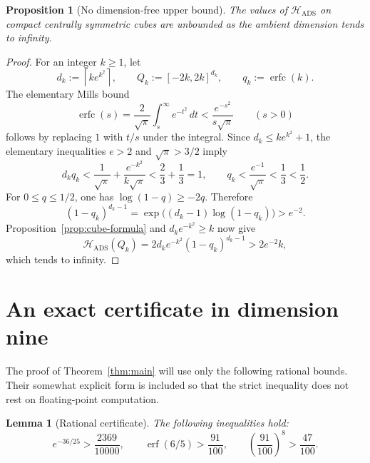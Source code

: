 \documentclass[11pt,reqno]{amsart}
\newtheorem{proposition}[theorem]{Proposition}
\newtheorem{lemma}[theorem]{Lemma}
\theoremstyle{remark}
\DeclareMathOperator{\erf}{erf}
\DeclareMathOperator{\erfc}{erfc}
\newcommand{\Hads}{\mathcal{H}_{\mathrm{ADS}}}
\begin{document}
\begin{proposition}[No dimension-free upper bound]\label{prop:unbounded}
The values of \(\Hads\) on compact centrally symmetric cubes are unbounded
as the ambient dimension tends to infinity.
\end{proposition}

\begin{proof}
For an integer \(k\ge1\), let
\[
 d_k:=\left\lceil k e^{k^2}\right\rceil,
 \qquad Q_k:=[-2k,2k]^{d_k},
 \qquad q_k:=\erfc(k).
\]
The elementary Mills bound
\begin{equation}\label{eq:mills}
 \erfc(s)
 =\frac{2}{\sqrt\pi}\int_s^\infty e^{-t^2}\,dt
 <\frac{e^{-s^2}}{s\sqrt\pi}
 \qquad(s>0)
\end{equation}
follows by replacing \(1\) with \(t/s\) under the integral.  Since
\(d_k\le k e^{k^2}+1\), the elementary inequalities \(e>2\) and
\(\sqrt\pi>3/2\) imply
\[
 d_kq_k
 <\frac1{\sqrt\pi}+\frac{e^{-k^2}}{k\sqrt\pi}
 <\frac23+\frac13=1,
 \qquad
 q_k<\frac{e^{-1}}{\sqrt\pi}<\frac13<\frac12.
\]
For \(0\le q\le1/2\), one has
\(\log(1-q)\ge-2q\).  Therefore
\[
 (1-q_k)^{d_k-1}
 =\exp\bigl((d_k-1)\log(1-q_k)\bigr)>e^{-2}.
\]
Proposition~\ref{prop:cube-formula} and
\(d_ke^{-k^2}\ge k\) now give
\[
 \Hads(Q_k)
 =2d_ke^{-k^2}(1-q_k)^{d_k-1}
 >2e^{-2}k,
\]
which tends to infinity.
\end{proof}

\section{An exact certificate in dimension nine}

The proof of Theorem~\ref{thm:main} will use only the following rational
bounds.  Their somewhat explicit form is included so that the strict
inequality does not rest on floating-point computation.

\begin{lemma}[Rational certificate]\label{lem:certificate}
The following inequalities hold:
\begin{equation}\label{eq:certificate}
 e^{-36/25}>\frac{2369}{10000},
 \qquad
 \erf(6/5)>\frac{91}{100},
 \qquad
 \left(\frac{91}{100}\right)^8>\frac{47}{100}.
\end{equation}
\end{lemma}
\end{document}
